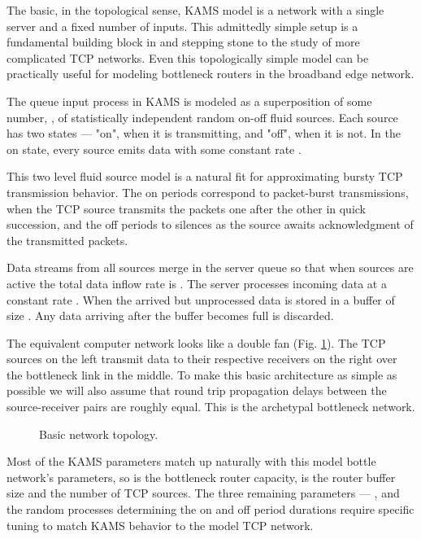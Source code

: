 \documentclass{IEEEtran}[10pt,letterpaper,conference]
\begin{document}
The basic, in the topological sense, KAMS model is a network with a single server and a fixed number of inputs. This admittedly simple setup is a fundamental building block in and stepping stone to the study of more complicated TCP networks. Even this topologically simple model can be practically useful for modeling bottleneck routers in the broadband edge network. 

The queue input process in KAMS is modeled as a superposition of some number, , of statistically independent random on-off fluid sources. Each source has two states --- "on", when it is transmitting, and "off", when it is not. In the on state, every source emits data with some constant rate . 

This two level fluid source model is a natural fit for approximating bursty TCP transmission behavior. The on periods correspond to packet-burst transmissions, when the TCP source transmits the packets one after the other in quick succession, and the off periods to silences as the source awaits acknowledgment of the transmitted packets. 

Data streams from all sources merge in the server queue so that when  sources are active the total data inflow rate is . The server processes incoming data at a constant rate . When  the arrived but unprocessed data is stored in a buffer of size . Any data arriving after the buffer becomes full is discarded.

The equivalent computer network looks like a double fan (Fig. \ref{network}). The TCP sources on the left transmit data to their respective receivers on the right over the bottleneck link in the middle. To make this basic architecture as simple as possible we will also assume that round trip propagation delays between the source-receiver pairs are roughly equal. This is the archetypal bottleneck network. 
\begin{figure}[ht]
\caption{Basic network topology.}
\label{network}
\end{figure}

Most of the KAMS parameters match up naturally with this model bottle network's parameters, so  is the bottleneck router capacity,  is the router buffer size and  the number of TCP sources. The three remaining parameters --- , and the random processes determining the on and off period durations require specific tuning to match KAMS behavior to the model TCP network.
\end{document}
